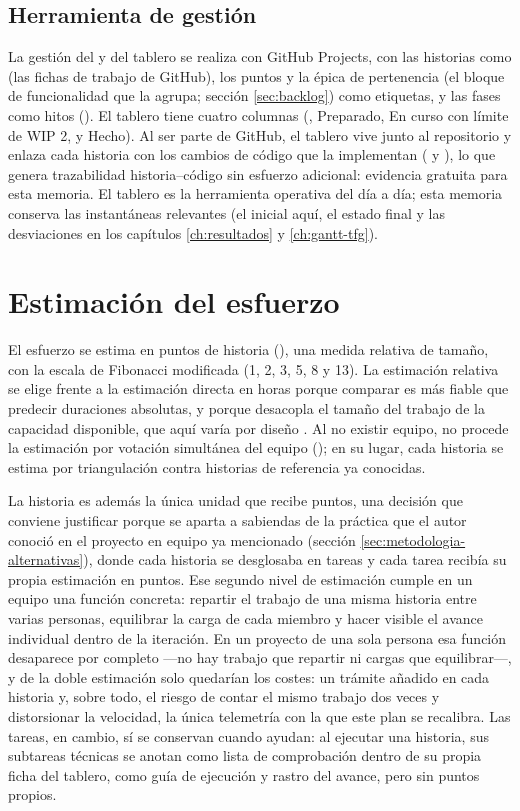 \subsection{Herramienta de gestión}
\label{sec:metodologia-herramienta}

La gestión del  y del tablero se realiza con GitHub Projects, con las historias como  (las fichas de trabajo de GitHub), los puntos y la épica de pertenencia (el bloque de funcionalidad que la agrupa; sección \ref{sec:backlog}) como etiquetas, y las fases como hitos ().
El tablero tiene cuatro columnas (, Preparado, En curso con límite de \acs{WIP} 2, y Hecho).
Al ser parte de GitHub, el tablero vive junto al repositorio y enlaza cada historia con los cambios de código que la implementan ( y ), lo que genera trazabilidad historia--código sin esfuerzo adicional: evidencia gratuita para esta memoria.
El tablero es la herramienta operativa del día a día; esta memoria conserva las instantáneas relevantes (el  inicial aquí, el estado final y las desviaciones en los capítulos \ref{ch:resultados} y \ref{ch:gantt-tfg}).

\section{Estimación del esfuerzo}
\label{sec:estimacion}

El esfuerzo se estima en puntos de historia (), una medida relativa de tamaño, con la escala de Fibonacci modificada (1, 2, 3, 5, 8 y 13).
La estimación relativa se elige frente a la estimación directa en horas porque comparar es más fiable que predecir duraciones absolutas, y porque desacopla el tamaño del trabajo de la capacidad disponible, que aquí varía por diseño \parencite{cohn-estimating}.
Al no existir equipo, no procede la estimación por votación simultánea del equipo (); en su lugar, cada historia se estima por triangulación contra historias de referencia ya conocidas.

La historia es además la única unidad que recibe puntos, una decisión que conviene justificar porque se aparta a sabiendas de la práctica que el autor conoció en el proyecto en equipo ya mencionado (sección \ref{sec:metodologia-alternativas}), donde cada historia se desglosaba en tareas y cada tarea recibía su propia estimación en puntos.
Ese segundo nivel de estimación cumple en un equipo una función concreta: repartir el trabajo de una misma historia entre varias personas, equilibrar la carga de cada miembro y hacer visible el avance individual dentro de la iteración.
En un proyecto de una sola persona esa función desaparece por completo —no hay trabajo que repartir ni cargas que equilibrar—, y de la doble estimación solo quedarían los costes: un trámite añadido en cada historia y, sobre todo, el riesgo de contar el mismo trabajo dos veces y distorsionar la velocidad, la única telemetría con la que este plan se recalibra.
Las tareas, en cambio, sí se conservan cuando ayudan: al ejecutar una historia, sus subtareas técnicas se anotan como lista de comprobación dentro de su propia ficha del tablero, como guía de ejecución y rastro del avance, pero sin puntos propios.

